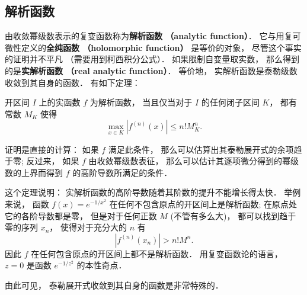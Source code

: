 \subsection{解析函数}
由收敛幂级数表示的复变函数称为\textbf{解析函数 （analytic function）}． 它与用复可微性定义的\textbf{全纯函数 （holomorphic function）} 是等价的对象， 尽管这个事实的证明并不平凡 （需要用到柯西积分公式）． 如果限制自变量取实数， 那么得到的是\textbf{实解析函数 （real analytic function）}． 等价地， 实解析函数是泰勒级数收敛到其自身的函数． 有如下定理：

\begin{theorem}{}
开区间 $I$ 上的实函数 $f$ 为解析函数， 当且仅当对于 $I$ 的任何闭子区间 $K$， 都有常数 $M_K$ 使得
$$
\max_{x\in K}|f^{(n)}(x)|\leq n!M_K^n.
$$
\end{theorem}

证明是直接的计算： 如果 $f$ 满足此条件， 那么可以估算出其泰勒展开式的余项趋于零; 反过来， 如果 $f$ 由收敛幂级数表征， 那么可以估计其逐项微分得到的幂级数的上界而得到 $f$ 的高阶导数所满足的条件．

这个定理说明： 实解析函数的高阶导数随着其阶数的提升不能增长得太快． 举例来说， 函数 $f(x)=e^{-1/x^2}$ 在任何不包含原点的开区间上是解析函数; 在原点处它的各阶导数都是零， 但是对于任何正数 $M$ (不管有多么大)， 都可以找到趋于零的序列 $x_n$， 使得对于充分大的 $n$ 有
$$
|f^{(n)}(x_n)|>n!M^n.
$$
因此 $f$ 在任何包含原点的开区间上都不是解析函数． 用复变函数论的语言， $z=0$ 是函数 $e^{-1/z^2}$ 的本性奇点．

由此可见， 泰勒展开式收敛到其自身的函数是非常特殊的．
